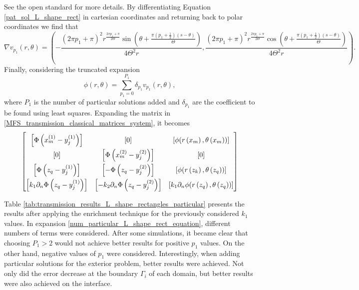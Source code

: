 See the open standard \cite{jones2010wg14} for more details.
By differentiating Equation \eqref{pat_sol_L_shape_rect} in cartesian coordinates and returning back to polar coordinates we find that
\begin{equation*}
    \nabla v_{p_1}(r, \theta) = \left(-\frac{(2 \pi  {p_1}+\pi )^2 r^{\frac{2 \pi  {p_1}+\pi }{2 \Theta }} \sin \left(\theta +\frac{\pi  \left(p_1+\frac{1}{2}\right) (s-\theta )}{\Theta }\right)}{4 \Theta ^2 r},\frac{(2 \pi  p_1+\pi )^2 r^{\frac{2 \pi  p_1+\pi }{2 \Theta }} \cos \left(\theta +\frac{\pi  \left(p_1+\frac{1}{2}\right) (s-\theta )}{\Theta }\right)}{4 \Theta ^2 r}\right).
\end{equation*}
Finally, considering the truncated expansion
\begin{equation}\label{num_particular_L_shape_rect_equation}
    \phi(r,\theta)=\sum_{p_1=0}^{P_1} \delta_{p_1} v_{p_1}(r, \theta),
\end{equation}
where \(P_1\) is the number of particular solutions added and \(\delta_{p_1}\) are the coefficient to be found using least squares. Expanding the matrix in \eqref{MFS_transmission_classical_matrices_system}, it becomes
\begin{equation}\label{transmission_mat_L_rect_exp}
    \renewcommand{\arraystretch}{1.75} %
    \begin{bmatrix}
        \left[\Phi\left(x^{(1)}_{m}-y_j^{(1)}\right)\right] & [0] & \left[\phi(r\left(x_m\right),\theta\left(x_m\right))\right]\\
        [0] & \left[\Phi\left(x^{(2)}_{m}-y_j^{(2)}\right)\right] & \left[0\right]\\
        \left[\Phi\left(z_q-y_j^{(1)}\right)\right] & \left[-\Phi\left(z_q-y_j^{(2)}\right)\right] & \left[\phi(r\left(z_k\right),\theta\left(z_q\right))\right]\\
        \left[k_1\partial_n \Phi\left(z_q-y_j^{(1)}\right)\right] & \left[-k_2 \partial_n \Phi\left(z_q-y_j^{(2)}\right)\right] & \left[k_1 \partial_n\phi(r\left(z_q\right),\theta\left(z_q\right))\right]
    \end{bmatrix}
\end{equation}

Table \ref{tab:transmission_results_L_shape_rectangles_particular} presents the results after applying the enrichment technique for the previously considered \(k_1\) values. In expansion \eqref{num_particular_L_shape_rect_equation}, different numbers of terms were considered. After some simulations, it became clear that choosing \(P_1 > 2\) would not achieve better results for positive \(p_1\) values. On the other hand, negative values of \(p_1\) were considered. Interestingly, when adding particular solutions for the exterior problem, better results were achieved. Not only did the error decrease at the boundary \(\Gamma_i\) of each domain, but better results were also achieved on the interface.

